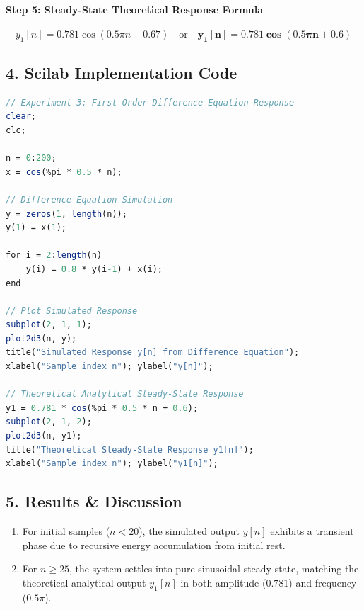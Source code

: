 \documentclass[11pt,a4paper]{article}
\begin{document}
\paragraph{Step 5: Steady-State Theoretical Response Formula}
\begin{equation}
    y_1[n] = 0.781 \cos(0.5\pi n - 0.67) \quad \text{or} \quad \mathbf{y_1[n] = 0.781 \cos(0.5\pi n + 0.6)}
\end{equation}

\subsection*{4. Scilab Implementation Code}
\begin{lstlisting}[language=Scilab]
// Experiment 3: First-Order Difference Equation Response
clear;
clc;

n = 0:200;
x = cos(%pi * 0.5 * n);

// Difference Equation Simulation
y = zeros(1, length(n));
y(1) = x(1);

for i = 2:length(n)
    y(i) = 0.8 * y(i-1) + x(i);
end

// Plot Simulated Response
subplot(2, 1, 1);
plot2d3(n, y);
title("Simulated Response y[n] from Difference Equation");
xlabel("Sample index n"); ylabel("y[n]");

// Theoretical Analytical Steady-State Response
y1 = 0.781 * cos(%pi * 0.5 * n + 0.6);
subplot(2, 1, 2);
plot2d3(n, y1);
title("Theoretical Steady-State Response y1[n]");
xlabel("Sample index n"); ylabel("y1[n]");
\end{lstlisting}

\subsection*{5. Results \& Discussion}
\begin{enumerate}
    \item For initial samples ($n < 20$), the simulated output $y[n]$ exhibits a transient phase due to recursive energy accumulation from initial rest.
    \item For $n \ge 25$, the system settles into pure sinusoidal steady-state, matching the theoretical analytical output $y_1[n]$ in both amplitude ($0.781$) and frequency ($0.5\pi$).
\end{enumerate}

\newpage

\end{document}
